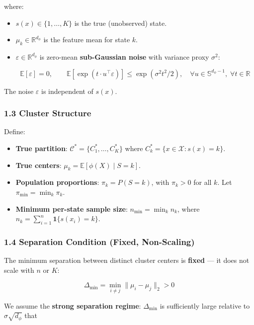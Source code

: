 \documentclass[
  12pt,
]{article}
\providecommand{\tightlist}{%
  \setlength{\itemsep}{0pt}\setlength{\parskip}{0pt}}
\begin{document}
where:

\begin{itemize}
\item
  \(s(x) \in \{1, \dots, K\}\) is the true (unobserved) state.
\item
  \(\mu_k \in \mathbb{R}^{d_\phi}\) is the feature mean for state \(k\).
\item
  \(\varepsilon \in \mathbb{R}^{d_\phi}\) is zero-mean
  \textbf{sub-Gaussian noise} with variance proxy \(\sigma^2\):

  \[\mathbb{E}[\varepsilon] = 0, \qquad
    \mathbb{E}[\exp(t \cdot u^\top \varepsilon)] \leq \exp(\sigma^2 t^2 / 2),
    \quad \forall u \in \mathbb{S}^{d_\phi-1}, \; \forall t \in \mathbb{R}\]
\end{itemize}

The noise \(\varepsilon\) is independent of \(s(x)\).

\subsubsection{1.3 Cluster Structure}\label{cluster-structure}

Define:

\begin{itemize}
\tightlist
\item
  \textbf{True partition}: \(\mathcal{C}^* = \{C_1^*, \dots, C_K^*\}\)
  where \(C_k^* = \{x \in \mathcal{X} : s(x) = k\}\).
\item
  \textbf{True centers}: \(\mu_k = \mathbb{E}[\phi(X) \mid S = k]\).
\item
  \textbf{Population proportions}: \(\pi_k = P(S = k)\), with
  \(\pi_k > 0\) for all \(k\). Let \(\pi_{\min} = \min_k \pi_k\).
\item
  \textbf{Minimum per-state sample size}: \(n_{\min} = \min_k n_k\),
  where \(n_k = \sum_{i=1}^n \mathbf{1}\{s(x_i) = k\}\).
\end{itemize}

\subsubsection{1.4 Separation Condition (Fixed,
Non-Scaling)}\label{separation-condition-fixed-non-scaling}

The minimum separation between distinct cluster centers is
\textbf{fixed} --- it does not scale with \(n\) or \(K\):

\[\Delta_{\min} = \min_{i \neq j} \|\mu_i - \mu_j\|_2 > 0\]

We assume the \textbf{strong separation regime}: \(\Delta_{\min}\) is
sufficiently large relative to \(\sigma \sqrt{d_\phi}\) that
\end{document}
